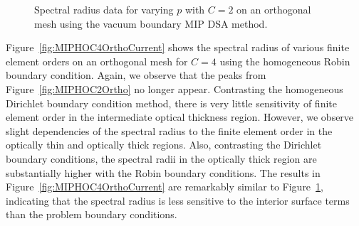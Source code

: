 \documentclass[12pt]{article}
\begin{document}
\begin{figure}[!hbt]
\centering
{}
\caption{Spectral radius data for varying $p$ with $C=2$ on an orthogonal mesh using the vacuum boundary MIP DSA method.}
\label{fig:MIPHOC2OrthoCurrent}
\end{figure}

\FloatBarrier

Figure~\ref{fig:MIPHOC4OrthoCurrent} shows the spectral radius of various finite element orders on an orthogonal mesh for $C=4$ using the homogeneous Robin boundary condition. Again, we observe that the peaks from Figure~\ref{fig:MIPHOC2Ortho} no longer appear. Contrasting the homogeneous Dirichlet boundary condition method, there is very little sensitivity of finite element order in the intermediate optical thickness region. However, we observe slight dependencies of the spectral radius to the finite element order in the optically thin and optically thick regions. Also, contrasting the Dirichlet boundary conditions, the spectral radii in the optically thick region are substantially higher with the Robin boundary conditions. The results in Figure~\ref{fig:MIPHOC4OrthoCurrent} are remarkably similar to Figure~\ref{fig:MIPHOC2OrthoCurrent}, indicating that the spectral radius is less sensitive to the interior surface terms than the problem boundary conditions.
\end{document}
